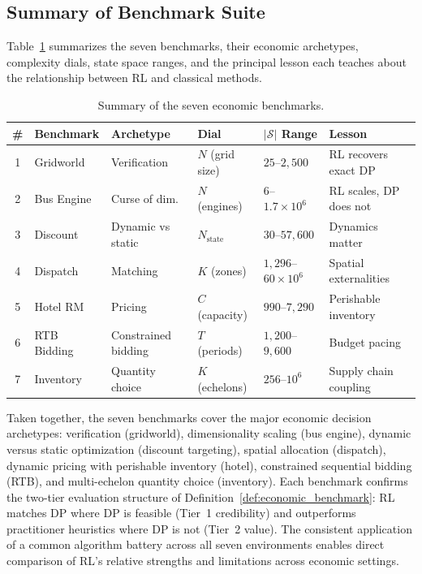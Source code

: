\subsection{Summary of Benchmark Suite}
\label{sec:benchmark_summary}

Table~\ref{tab:benchmark_summary} summarizes the seven benchmarks, their economic archetypes, complexity dials, state space ranges, and the principal lesson each teaches about the relationship between RL and classical methods.

\begin{table}[htbp]
\centering
\caption{Summary of the seven economic benchmarks.}
\label{tab:benchmark_summary}
\begin{tabular}{clllll}
\toprule
\# & Benchmark & Archetype & Dial & $|\mathcal{S}|$ Range & Lesson \\
\midrule
1 & Gridworld & Verification & $N$ (grid size) & $25$--$2{,}500$ & RL recovers exact DP \\
2 & Bus Engine & Curse of dim. & $N$ (engines) & $6$--$1.7 \times 10^6$ & RL scales, DP does not \\
3 & Discount & Dynamic vs static & $N_{\mathrm{state}}$ & $30$--$57{,}600$ & Dynamics matter \\
4 & Dispatch & Matching & $K$ (zones) & $1{,}296$--$60 \times 10^6$ & Spatial externalities \\
5 & Hotel RM & Pricing & $C$ (capacity) & $990$--$7{,}290$ & Perishable inventory \\
6 & RTB Bidding & Constrained bidding & $T$ (periods) & $1{,}200$--$9{,}600$ & Budget pacing \\
7 & Inventory & Quantity choice & $K$ (echelons) & $256$--$10^6$ & Supply chain coupling \\
\bottomrule
\end{tabular}
\end{table}

Taken together, the seven benchmarks cover the major economic decision archetypes: verification (gridworld), dimensionality scaling (bus engine), dynamic versus static optimization (discount targeting), spatial allocation (dispatch), dynamic pricing with perishable inventory (hotel), constrained sequential bidding (RTB), and multi-echelon quantity choice (inventory). Each benchmark confirms the two-tier evaluation structure of Definition~\ref{def:economic_benchmark}: RL matches DP where DP is feasible (Tier~1 credibility) and outperforms practitioner heuristics where DP is not (Tier~2 value). The consistent application of a common algorithm battery across all seven environments enables direct comparison of RL's relative strengths and limitations across economic settings.
